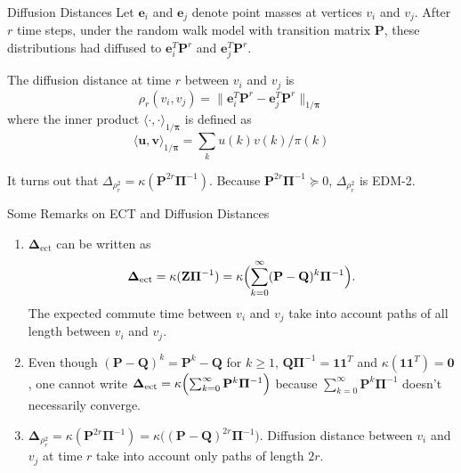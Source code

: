 \documentclass[professionalfonts,hyperref={pdfpagelabels=false,colorlinks=true,linkcolor=blue}]{beamer}
\begin{document}
\begin{frame}{Diffusion Distances}
  Let $\bm{e}_i$ and $\bm{e}_j$ denote point masses at vertices $v_i$ and
  $v_j$. After $r$ time steps, under the random walk model with
  transition matrix $\mathbf{P}$, these distributions had diffused to
  $\bm{e}_i^{T} \mathbf{P}^{r}$ and $\bm{e}_j^{T}\mathbf{P}^{r}$. 
  
  \vskip10pt The diffusion distance \cite{coifman06:_diffus_maps} at
  time $r$ between $v_i$ and $v_j$ is
    \begin{equation*}
      \rho_{r}(v_i,v_j) = \| \bm{e}_i^{T} \mathbf{P}^{r} -
      \bm{e}_j^{T}
      \mathbf{P}^{r} \|_{1/\bm{\pi}}
    \end{equation*}
    where the inner product $\langle \cdot, \cdot
    \rangle_{1/\bm{\pi}}$ is defined as
    \begin{equation*}
      \langle \bm{u}, \bm{v} \rangle_{1/\bm{\pi}} = \sum_{k} u(k)
      v(k)/\pi(k)
    \end{equation*}
    
      \vskip10pt
      It turns out that $\Delta_{\rho_{r}^{2}} =
      \kappa(\mathbf{P}^{2r}\bm{\Pi}^{-1})$. 
      Because $\mathbf{P}^{2r}\bm{\Pi}^{-1} \succeq 0$,
      $\Delta_{\rho_{r}^{2}}$ is EDM-2.  
\end{frame}

\begin{frame}{Some Remarks on ECT and Diffusion
  Distances}
  \begin{enumerate}
  \item $\bm{\Delta}_{\mathrm{ect}}$ can be written as
    \begin{equation*}
      \bm{\Delta}_{\mathrm{ect}} = \kappa(\mathbf{Z}\bm{\Pi}^{-1}) =
      \kappa\Bigl( \sum_{k=0}^{\infty}(\mathbf{P} -
      \mathbf{Q})^{k}\bm{\Pi}^{-1}\Bigr).
    \end{equation*}
    The expected commute time between $v_i$ and $v_j$ take into account
    paths of all length between $v_i$ and $v_j$.
  \item Even though $(\mathbf{P} - \mathbf{Q})^{k} =
    \mathbf{P}^{k} - \mathbf{Q}$ for $k \geq 1$,
    $\mathbf{Q}\bm{\Pi}^{-1} = \bm{1}\bm{1}^{T}$ and
    $\kappa(\bm{1}\bm{1}^{T}) = \bm{0}$, one cannot write
    $\bm{\Delta}_{\mathrm{ect}} =
    \kappa\Bigl(\sum_{k=0}^{\infty}\mathbf{P}^{k}\bm{\Pi}^{-1}\Bigr)$
    because $\sum_{k=0}^{\infty}\mathbf{P}^{k}\bm{\Pi}^{-1}$
    doesn't necessarily converge.
  \item $\bm{\Delta}_{\rho_{r}^{2}} =
    \kappa(\mathbf{P}^{2r}\bm{\Pi}^{-1}) = \kappa\bigl((\mathbf{P} -
    \mathbf{Q})^{2r}\bm{\Pi}^{-1}\bigr)$. Diffusion distance between
    $v_i$ and $v_j$ at time $r$ take into account only paths of length
    $2r$.
  \end{enumerate}
\end{frame}
\end{document}
